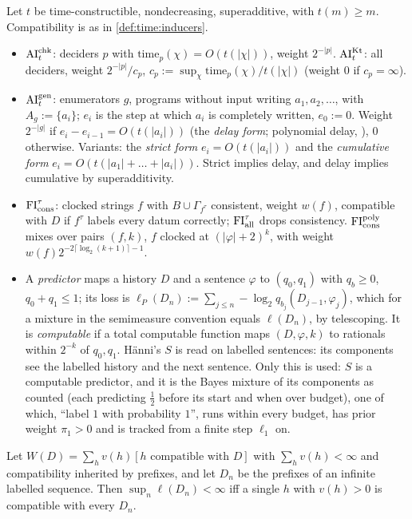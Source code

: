 \begin{definition}\label{def:time:penalties}
Let $t$ be time-constructible, nondecreasing, superadditive, with $t(m)\ge m$. Compatibility is as in \cref{def:time:inducers}.
\begin{itemize}[leftmargin=*,itemsep=1pt]
\item $\mathrm{AI}^{\mathrm{chk}}_t$: deciders $p$ with $\mathrm{time}_p(\chi)=O(t(|\chi|))$, weight $2^{-|p|}$. $\mathrm{AI}^{\mathrm{Kt}}_t$: all deciders, weight $2^{-|p|}/c_p$, $c_p:=\sup_\chi\mathrm{time}_p(\chi)/t(|\chi|)$ (weight $0$ if $c_p=\infty$).
\item $\mathrm{AI}^{\mathrm{gen}}_t$: enumerators $g$, programs without input writing $a_1,a_2,\dots$, with $A_g:=\{a_i\}$; $e_i$ is the step at which $a_i$ is completely written, $e_0:=0$. Weight $2^{-|g|}$ if $e_i-e_{i-1}=O(t(|a_i|))$ (the \emph{delay form}; polynomial delay, \citealp{johnson1988generating}), $0$ otherwise. Variants: the \emph{strict form} $e_i=O(t(|a_i|))$ and the \emph{cumulative form} $e_i=O(t(|a_1|+\dots+|a_i|))$. Strict implies delay, and delay implies cumulative by superadditivity.
\item $\mathrm{FI}_{\mathrm{cons}}^\tau$: clocked strings $f$ with $B\cup\Gamma_{f^\tau}$ consistent, weight $w(f)$, compatible with $D$ if $f^\tau$ labels every datum correctly; $\mathrm{FI}_{\mathrm{all}}^\tau$ drops consistency. $\mathrm{FI}_{\mathrm{cons}}^{\mathrm{poly}}$ mixes over pairs $(f,k)$, $f$ clocked at $(|\varphi|+2)^k$, with weight $w(f)2^{-2\lceil\log_2(k+1)\rceil-1}$.
\item A \emph{predictor} maps a history $D$ and a sentence $\varphi$ to $(q_0,q_1)$ with $q_b\ge0$, $q_0+q_1\le1$; its loss is $\ell_P(D_n):=\sum_{j\le n}-\log_2q_{b_j}(D_{j-1},\varphi_j)$, which for a mixture in the semimeasure convention equals $\ell(D_n)$, by telescoping. It is \emph{computable} if a total computable function maps $(D,\varphi,k)$ to rationals within $2^{-k}$ of $q_0,q_1$. H\"anni's $S$ is read on labelled sentences: its components see the labelled history and the next sentence. Only this is used: $S$ is a computable predictor, and it is the Bayes mixture of its components as counted (each predicting $\frac12$ before its start and when over budget), one of which, ``label $1$ with probability $1$'', runs within every budget, has prior weight $\pi_1>0$ and is tracked from a finite step $\ell_1$ on.
\end{itemize}
\end{definition}

\begin{lemma}\label{lem:time:bounded}
Let $W(D)=\sum_hv(h)[h\text{ compatible with }D]$ with $\sum_hv(h)<\infty$ and compatibility inherited by prefixes, and let $D_n$ be the prefixes of an infinite labelled sequence. Then $\sup_n\ell(D_n)<\infty$ iff a single $h$ with $v(h)>0$ is compatible with every $D_n$.
\end{lemma}

